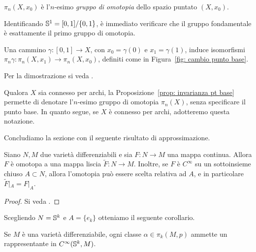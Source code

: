 

\begin{defi}
	\(\pi_n(X,x_0)\) è l'\(n\)-esimo \textit{gruppo di omotopia} dello spazio puntato \((X,x_0)\).
\end{defi}

\begin{oss}
	Identificando \(\mathbb{S}^1 = [0,1]/\{0,1\}\), è immediato verificare che il gruppo fondamentale è esattamente il primo gruppo di omotopia. 
\end{oss}

\begin{prop}\label{prop: invarianza pt base}
	Una cammino \(\gamma: [0,1] \to X\), con \(x_0 = \gamma(0)\) e \(x_1=\gamma(1)\), induce isomorfismi \(\pi_n \gamma: \pi_n(X,x_1) \to \pi_n(X,x_0)\), definiti come in Figura~\ref{fig: cambio punto base}.
\end{prop}
Per la dimostrazione si veda \cite[p. 341]{hatcher2000algebraic}.




Qualora \(X\) sia connesso per archi, la Proposizione~\ref{prop: invarianza pt base} permette di denotare l'\(n\)-esimo gruppo di omotopia \(\pi_n(X)\), senza specificare il punto base. In quanto segue, se \(X\) è connesso per archi, adotteremo questa notazione.

Concludiamo la sezione con il seguente risultato di approssimazione.

\begin{teo}\label{teo: approssimazione whitney}
	Siano \(N,M\) due varietà differenziabili e sia \(F:N \to M\) una mappa continua. Allora \(F\) è omotopa a una mappa liscia \(\widetilde{F}:N \to M\). Inoltre, se \(F\) è \(C^\infty\) su un sottoinsieme chiuso \(A \subset N\), allora l'omotopia può essere scelta relativa ad \(A\), e in particolare \(\widetilde{F}|_A = F|_A\).
\end{teo}
\begin{proof}
	Si veda \cite[Theorem 6.19]{lee2012smooth}.
\end{proof}

Scegliendo \(N=\mathbb{S}^k\) e \(A=\{e_k\}\) otteniamo il seguente corollario.
\begin{cor}\label{cor: rappresentazione liscia}
	Se \(M\) è una varietà differenziabile, ogni classe \(\alpha \in \pi_k(M,p)\) ammette un rappresentante in \(C^\infty(\mathbb{S}^k,M)\). 
\end{cor}

